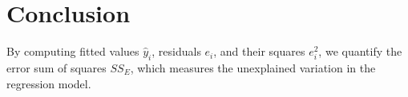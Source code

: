 \documentclass[10pt]{article}
\begin{document}
\section*{Conclusion}
By computing fitted values $\hat{y}_i$, residuals $e_i$, and their squares $e_i^2$, we quantify the error sum of squares $SS_E$, which measures the unexplained variation in the regression model.



\end{document}
